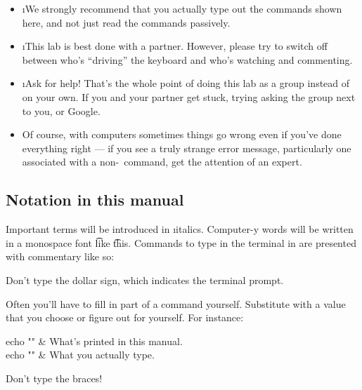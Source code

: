 \documentclass[letterpaper, 12pt, titlepage, twoside]{article}
\begin{document}
\begin{itemize}
\item \i{We strongly recommend that you actually type out the commands shown
  here}, \x and not just read the commands passively.

\item \i{This lab is best done with a partner.} However, please try to switch
  off between who's ``driving'' the keyboard and who's watching and
  commenting.

\item \i{Ask for help!} That's the whole point of doing this lab as a group
  instead of on your own. If you and your partner get stuck, trying asking the
  group next to you, or Google.

\item Of course, with computers sometimes things go wrong even if you've done
  everything right --- if you see a truly strange error message, particularly
  one associated with a non-\git\ command, get the attention of an expert.
\end{itemize}

\subsection*{Notation in this manual}

Important terms will be introduced in \i{italics}. Computer-y words will be
written in a monospace font \t{like} \t{this}. Commands to type in the
terminal in are presented with commentary like so:


Don't type the dollar sign, which indicates the terminal prompt.

Often you'll have to fill in part of a command yourself. Substitute  with a value that you choose or figure out for yourself. For instance:

\nopagebreak

\begin{typeme}
echo "" & What's printed in this manual. \\
echo "\the\year" & What you actually type.
\end{typeme}

Don't type the braces!

\end{document}
